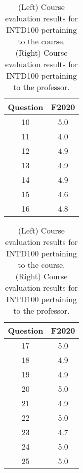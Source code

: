 \documentclass[../../../main.tex]{subfiles}
\begin{document}
\begin{table}
\footnotesize
\centering
\begin{tabular}{| c | c |}
\hline
\hline
Question & F2020 \\ \hline
10 & 5.0 \\ \hline
11 & 4.0 \\ \hline
12 & 4.9 \\ \hline
13 & 4.9 \\ \hline
14 & 4.9 \\ \hline
15 & 4.6 \\ \hline
16 & 4.8 \\ \hline
\hline
\end{tabular}
\begin{tabular}{| c | c |}
\hline
\hline
Question & F2020 \\ \hline
17 & 5.0 \\ \hline
18 & 4.9 \\ \hline
19 & 4.9 \\ \hline
20 & 5.0 \\ \hline
21 & 4.9 \\ \hline
22 & 5.0 \\ \hline
23 & 4.7 \\ \hline
24 & 5.0 \\ \hline
25 & 5.0 \\ \hline
\hline
\end{tabular}
\caption{\label{tab:eval_100} (Left) Course evaluation results for INTD100 pertaining to the course.  (Right) Course evaluation results for INTD100 pertaining to the professor.}
\end{table}
\end{document}
